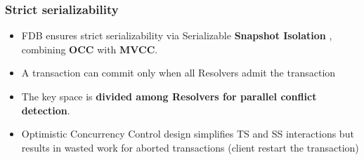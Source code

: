 \begin{frame}
	\frametitle{Strict serializability}
\begin{itemize}
  \item FDB ensures strict serializability via Serializable \textbf{Snapshot Isolation} , combining \textbf{OCC} with \textbf{MVCC}.
  \item A transaction can commit only when all Resolvers admit the transaction
  \item The key space is \textbf{divided among Resolvers for parallel conflict detection}.
  \item Optimistic Concurrency Control design simplifies TS and SS interactions but results in wasted work for aborted transactions (client restart the transaction)
\end{itemize}

 \end{frame}



